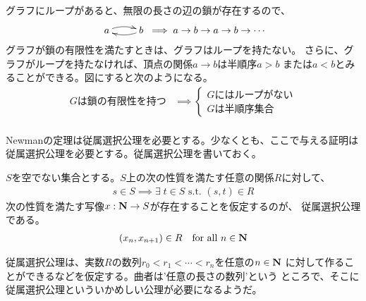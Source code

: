 {	グラフにループがあると、無限の長さの辺の鎖が存在するので、
	\begin{equation*}\begin{split}
		\xymatrix{
			a \ar@/^1ex/[r] & b \ar@/^1ex/[l]
		}\implies a\to b\to a\to b\to\cdots
	\end{split}\end{equation*}
	グラフが鎖の有限性を満たすときは、グラフはループを持たない。
	さらに、グラフがループを持たなければ、頂点の関係$a\to b$は半順序$a>b$
	または$a<b$とみることができる。図にすると次のようになる。
	\begin{equation*}\begin{split}
		\text{$G$は鎖の有限性を持つ} &\implies \left\{\begin{array}{l}
			\text{$G$にはループがない} \\
			\text{$G$は半順序集合}
		\end{array}\right. \\
	\end{split}\end{equation*}

	Newmanの定理は従属選択公理を必要とする。少なくとも、ここで与える証明は
	従属選択公理を必要とする。従属選択公理を書いておく。

	\begin{definition}
	\label{def:従属選択公理} %
		$S$を空でない集合とする。$S$上の次の性質を満たす任意の関係$R$に対して、
		\begin{equation*}\begin{split}
			s\in S\implies \exists\; t\in S\text{ s.t. } (s,t)\in R
		\end{split}\end{equation*}
		次の性質を満たす写像$x:\mathbf{N}\to S$が存在することを仮定するのが、
		従属選択公理である。
		\begin{equation*}\begin{split}
			(x_n,x_{n+1})\in R \quad\text{for all } n\in\mathbf{N}
		\end{split}\end{equation*}
	\end{definition} %

	従属選択公理は、実数$R$の数列$r_0<r_1<\cdots< r_n$を任意の$n\in\mathbf{N}$
	に対して作ることができるなどを仮定する。曲者は'任意の長さの数列'という
	ところで、そこに従属選択公理といういかめしい公理が必要になるようだ。

}
